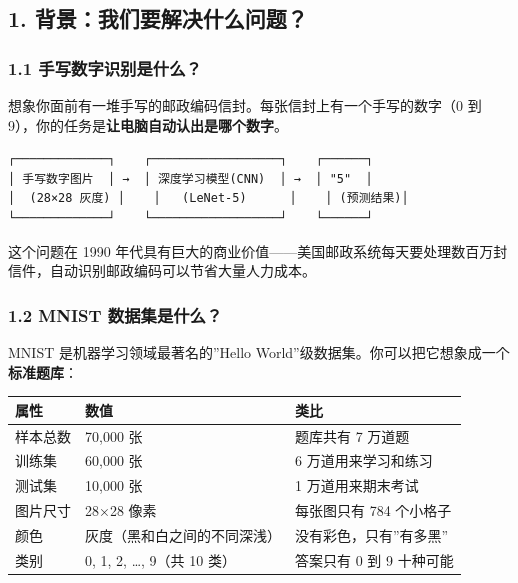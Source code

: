 \documentclass[
  11pt,
]{ctexart}
\newcounter{none} %
\begin{document}
\subsection{1.
背景：我们要解决什么问题？}\label{ux80ccux666fux6211ux4eecux8981ux89e3ux51b3ux4ec0ux4e48ux95eeux9898}

\subsubsection{1.1
手写数字识别是什么？}\label{ux624bux5199ux6570ux5b57ux8bc6ux522bux662fux4ec0ux4e48}

想象你面前有一堆手写的邮政编码信封。每张信封上有一个手写的数字（0 到
9），你的任务是\textbf{让电脑自动认出是哪个数字}。

\begin{verbatim}
┌─────────────┐    ┌──────────────────┐    ┌──────┐
│ 手写数字图片  │ →  │ 深度学习模型(CNN)  │ →  │ "5"  │
│  (28×28 灰度) │    │   (LeNet-5)      │    │ (预测结果)│
└─────────────┘    └──────────────────┘    └──────┘
\end{verbatim}

这个问题在 1990
年代具有巨大的商业价值——美国邮政系统每天要处理数百万封信件，自动识别邮政编码可以节省大量人力成本。

\subsubsection{1.2 MNIST
数据集是什么？}\label{mnist-ux6570ux636eux96c6ux662fux4ec0ux4e48}

MNIST 是机器学习领域最著名的”Hello
World”级数据集。你可以把它想象成一个\textbf{标准题库}：

{\def\LTcaptype{none} %
\begin{longtable}[]{@{}lll@{}}
\toprule\noalign{}
属性 & 数值 & 类比 \\
\midrule\noalign{}
\endhead
\bottomrule\noalign{}
\endlastfoot
样本总数 & 70,000 张 & 题库共有 7 万道题 \\
训练集 & 60,000 张 & 6 万道用来学习和练习 \\
测试集 & 10,000 张 & 1 万道用来期末考试 \\
图片尺寸 & 28×28 像素 & 每张图只有 784 个小格子 \\
颜色 & 灰度（黑和白之间的不同深浅） & 没有彩色，只有”有多黑” \\
类别 & 0, 1, 2, …, 9（共 10 类） & 答案只有 0 到 9 十种可能 \\
\end{longtable}
}
\end{document}
